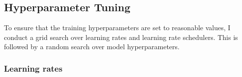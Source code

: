 


\subsection{Hyperparameter Tuning}

To ensure that the training hyperparameters are set to reasonable values, I conduct a grid search over learning rates and learning rate schedulers. This is followed by a random search over model hyperparameters. 

\subsubsection{Learning rates}\label{sec:lr_search}

